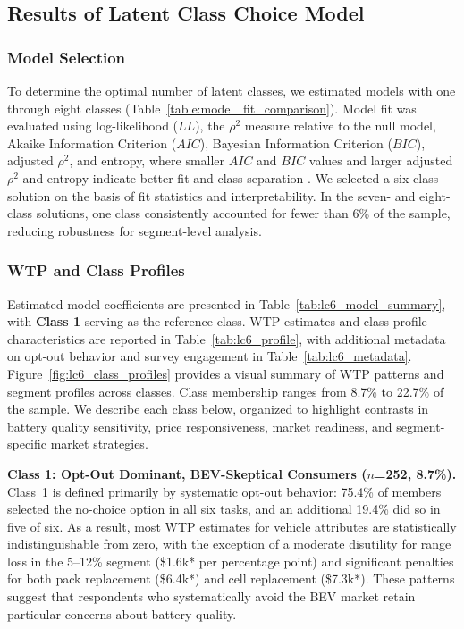 \documentclass[a4paper,fleqn]{cas-sc}   %
\begin{document}


\subsection{Results of Latent Class Choice Model}
\subsubsection{Model Selection}

To determine the optimal number of latent classes, we estimated models with one through eight classes (Table~\ref{table:model_fit_comparison}). Model fit was evaluated using log-likelihood ($LL$), the $\rho^2$ measure relative to the null model, Akaike Information Criterion ($AIC$), Bayesian Information Criterion ($BIC$), adjusted $\rho^2$, and entropy, where smaller $AIC$ and $BIC$ values and larger adjusted $\rho^2$ and entropy indicate better fit and class separation \parencite{nylundDecidingNumberClasses2007}. We selected a six-class solution on the basis of fit statistics and interpretability. In the seven- and eight-class solutions, one class consistently accounted for fewer than 6\% of the sample, reducing robustness for segment-level analysis.



\subsubsection{WTP and Class Profiles}

Estimated model coefficients are presented in Table~\ref{tab:lc6_model_summary}, with \textbf{Class 1} serving as the reference class. WTP estimates and class profile characteristics are reported in Table~\ref{tab:lc6_profile}, with additional metadata on opt-out behavior and survey engagement in Table~\ref{tab:lc6_metadata}. Figure~\ref{fig:lc6_class_profiles} provides a visual summary of WTP patterns and segment profiles across classes. Class membership ranges from 8.7\% to 22.7\% of the sample. We describe each class below, organized to highlight contrasts in battery quality sensitivity, price responsiveness, market readiness, and segment-specific market strategies.

\medskip

\noindent\textbf{Class 1: Opt-Out Dominant, BEV-Skeptical Consumers ($n$=252, 8.7\%).}\\
Class~1 is defined primarily by systematic opt-out behavior: 75.4\% of members selected the no-choice option in all six tasks, and an additional 19.4\% did so in five of six. As a result, most WTP estimates for vehicle attributes are statistically indistinguishable from zero, with the exception of a moderate disutility for range loss in the 5--12\% segment (\$1.6k* per percentage point) and significant penalties for both pack replacement (\$6.4k*) and cell replacement (\$7.3k*). These patterns suggest that respondents who systematically avoid the BEV market retain particular concerns about battery quality.
\end{document}
